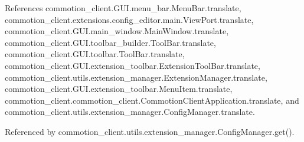 References commotion\-\_\-client.\-G\-U\-I.\-menu\-\_\-bar.\-Menu\-Bar.\-translate, commotion\-\_\-client.\-extensions.\-config\-\_\-editor.\-main.\-View\-Port.\-translate, commotion\-\_\-client.\-G\-U\-I.\-main\-\_\-window.\-Main\-Window.\-translate, commotion\-\_\-client.\-G\-U\-I.\-toolbar\-\_\-builder.\-Tool\-Bar.\-translate, commotion\-\_\-client.\-G\-U\-I.\-toolbar.\-Tool\-Bar.\-translate, commotion\-\_\-client.\-G\-U\-I.\-extension\-\_\-toolbar.\-Extension\-Tool\-Bar.\-translate, commotion\-\_\-client.\-utils.\-extension\-\_\-manager.\-Extension\-Manager.\-translate, commotion\-\_\-client.\-G\-U\-I.\-extension\-\_\-toolbar.\-Menu\-Item.\-translate, commotion\-\_\-client.\-commotion\-\_\-client.\-Commotion\-Client\-Application.\-translate, and commotion\-\_\-client.\-utils.\-extension\-\_\-manager.\-Config\-Manager.\-translate.



Referenced by commotion\-\_\-client.\-utils.\-extension\-\_\-manager.\-Config\-Manager.\-get().


